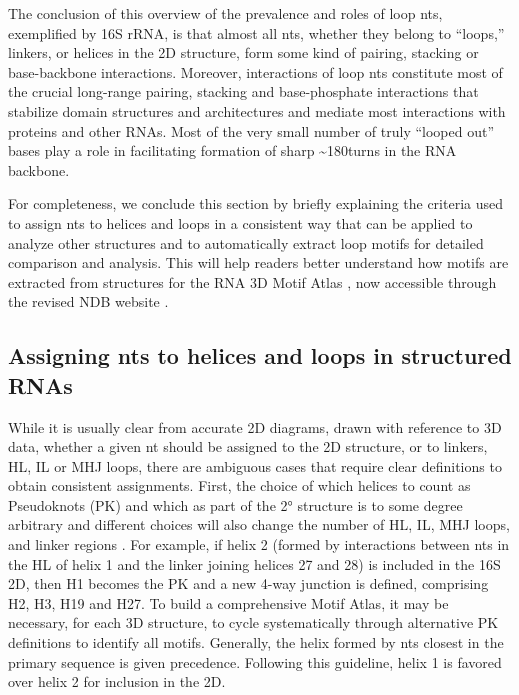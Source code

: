 The conclusion of this overview of the prevalence and roles of loop nts,
exemplified by 16S rRNA, is that almost all nts, whether they belong to ``loops,''
linkers, or helices in the 2D structure, form some kind of pairing, stacking or
base-backbone interactions. Moreover, interactions of loop nts constitute most
of the crucial long-range pairing, stacking and base-phosphate interactions that
stabilize domain structures and architectures and mediate most interactions with
proteins and other RNAs. Most of the very small number of truly “looped out”
bases play a role in facilitating formation of sharp \textasciitilde 180\degree turns in the RNA
backbone. 

For completeness, we conclude this section by briefly explaining the criteria
used to assign nts to helices and loops in a consistent way that can be applied
to analyze other structures and to automatically extract loop motifs for
detailed comparison and analysis.  This will help readers better understand how
motifs are extracted from structures for the RNA 3D Motif Atlas \cite{Petrov2013}, now
accessible through the revised NDB website \cite{CoimbatoreNarayanan2014}. 

\subsection{Assigning nts to helices and loops in structured RNAs}

While it is usually clear from accurate 2D diagrams, drawn with reference to 3D
data, whether a given nt should be assigned to the 2D structure, or to linkers,
HL, IL or MHJ loops, there are ambiguous cases that require clear definitions to
obtain consistent assignments. First, the choice of which helices to count as
Pseudoknots (PK) and which as part of the 2° structure is to some degree
arbitrary and different choices will also change the number of HL, IL, MHJ
loops, and linker regions \cite{Smit2008}. For example, if helix 2 (formed by
interactions between nts in the HL of helix 1 and the linker joining helices 27
and 28) is included in the 16S 2D, then H1 becomes the PK and a new 4-way
junction is defined, comprising H2, H3, H19 and H27. To build a comprehensive
Motif Atlas, it may be necessary, for each 3D structure, to cycle systematically
through alternative PK definitions to identify all motifs. Generally, the helix
formed by nts closest in the primary sequence is given precedence. Following
this guideline, helix 1 is favored over helix 2 for inclusion in the 2D. 

